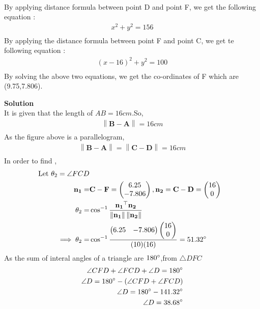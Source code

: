\documentclass{article}
\providecommand{\norm}[1]{\left\lVert#1\right\rVert}
\newcommand{\myvec}[1]{\ensuremath{\begin{pmatrix}#1\end{pmatrix}}}
\let\vec\mathbf
\begin{document}
\begin{enumerate}
\begin{align}
		\end{align}
By applying distance formula between point D and point F, we get the following equation : \\
			\begin{align}
			x^2 + y^2 = 156
			\label{eq:1}\\
			\end{align}
By applying the distance formula between point F and point C, we get te following equation :\\
		\begin{align}
			(x-16)^2 + y^2 = 100
			\label{eq:2}\\
			\end{align}
By solving the above two equations, we get the co-ordinates of F which are (9.75,7.806).
\end{enumerate}
\textbf{Solution}\\
It is given that the length of $AB = 16cm$.So,\\
\begin{align}
	\norm{\vec{B} - \vec{A}} = 16cm \\
\end{align}
As the figure above is a parallelogram,\\
\begin{align}
	\norm{\vec{B} - \vec{A}} = \norm{\vec{C} - \vec{D}} = 16cm
	\label{eq:3}\\
\end{align}
\vspace{5mm}
In order to find ,\\
\begin{align}
	\text{ Let }\theta_2 = \angle{FCD}\\
\vec{n_1} = &\vec{C} - \vec{F} = \myvec{6.25\\-7.806}, \vec{n_2} = \vec{C} - \vec{D} = \myvec{16\\0} \\
\theta_2 = &\cos^{-1}\frac{\vec{n_1}^\top\vec{n_2}}{\norm{\vec{n_1}}\norm{\vec{n_2}}} \\
	\implies\theta_2 = &\cos^{-1}\frac{\myvec{6.25&-7.806}\myvec{16\\0}}{(10)(16)} = 51.32\degree
\end{align}
As the sum of interal angles of a triangle are $180\degree$,from $\triangle{DFC}$\\
\begin{align}
	\angle{CFD} + \angle{FCD} + \angle{D} = 180\degree\\
	\angle{D} = 180\degree - (\angle{CFD} + \angle{FCD})\\
	\angle{D} = 180\degree - 141.32\degree \\
	\angle{D} = 38.68\degree
	\label{eq:4}\\
\end{align}
\end{document}
